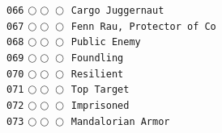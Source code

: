 \documentclass[a4paper,landscape]{article}
\begin{document}
\begin{multicols*}{5}
\texttt{066} \(\bigcirc\!\bigcirc\!\bigcirc\)  \texttt{Cargo Juggernaut} \vspace{-0.3mm}\\ 
\texttt{067} \(\bigcirc\!\bigcirc\!\bigcirc\)  \texttt{Fenn Rau, Protector of Co} \vspace{-0.3mm}\\ 
\texttt{068} \(\bigcirc\!\bigcirc\!\bigcirc\)  \texttt{Public Enemy} \vspace{-0.3mm}\\ 
\texttt{069} \(\bigcirc\!\bigcirc\!\bigcirc\)  \texttt{Foundling} \vspace{-0.3mm}\\ 
\texttt{070} \(\bigcirc\!\bigcirc\!\bigcirc\)  \texttt{Resilient} \vspace{-0.3mm}\\ 
\texttt{071} \(\bigcirc\!\bigcirc\!\bigcirc\)  \texttt{Top Target} \vspace{-0.3mm}\\ 
\texttt{072} \(\bigcirc\!\bigcirc\!\bigcirc\)  \texttt{Imprisoned} \vspace{-0.3mm}\\ 
\texttt{073} \(\bigcirc\!\bigcirc\!\bigcirc\)  \texttt{Mandalorian Armor} \vspace{-0.3mm}\\ 

\end{multicols*}
\end{document}
